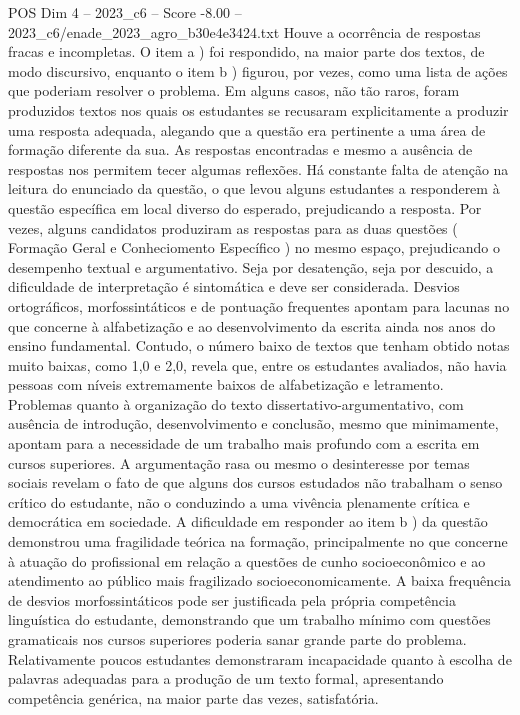 \begin{textsample}{POS Dim 4 – 2023\_c6 – Score -8.00 – 2023\_c6/enade\_2023\_agro\_b30e4e3424.txt}
Houve a ocorrência de respostas fracas e incompletas.
O item a ) foi respondido, na maior parte dos textos, de modo discursivo, enquanto o item b ) figurou, por vezes, como uma lista de ações que poderiam resolver o problema.
Em alguns casos, não tão raros, foram produzidos textos nos quais os estudantes se recusaram explicitamente a produzir uma resposta adequada, alegando que a questão era pertinente a uma área de formação diferente da sua.
As respostas encontradas e mesmo a ausência de respostas nos permitem tecer algumas reflexões.
Há constante falta de atenção na leitura do enunciado da questão, o que levou alguns estudantes a responderem à questão específica em local diverso do esperado, prejudicando a resposta.
Por vezes, alguns candidatos produziram as respostas para as duas questões ( Formação Geral e Conheciomento Específico ) no mesmo espaço, prejudicando o desempenho textual e argumentativo.
Seja por desatenção, seja por descuido, a dificuldade de interpretação é sintomática e deve ser considerada.
Desvios ortográficos, morfossintáticos e de pontuação frequentes apontam para lacunas no que concerne à alfabetização e ao desenvolvimento da escrita ainda nos anos do ensino fundamental.
Contudo, o número baixo de textos que tenham obtido notas muito baixas, como 1,0 e 2,0, revela que, entre os estudantes avaliados, não havia pessoas com níveis extremamente baixos de alfabetização e letramento.
Problemas quanto à organização do texto dissertativo-argumentativo, com ausência de introdução, desenvolvimento e conclusão, mesmo que minimamente, apontam para a necessidade de um trabalho mais profundo com a escrita em cursos superiores.
A argumentação rasa ou mesmo o desinteresse por temas sociais revelam o fato de que alguns dos cursos estudados não trabalham o senso crítico do estudante, não o conduzindo a uma vivência plenamente crítica e democrática em sociedade.
A dificuldade em responder ao item b ) da questão demonstrou uma fragilidade teórica na formação, principalmente no que concerne à atuação do profissional em relação a questões de cunho socioeconômico e ao atendimento ao público mais fragilizado socioeconomicamente.
A baixa frequência de desvios morfossintáticos pode ser justificada pela própria competência linguística do estudante, demonstrando que um trabalho mínimo com questões gramaticais nos cursos superiores poderia sanar grande parte do problema.
Relativamente poucos estudantes demonstraram incapacidade quanto à escolha de palavras adequadas para a produção de um texto formal, apresentando competência genérica, na maior parte das vezes, satisfatória.

\end{textsample}
